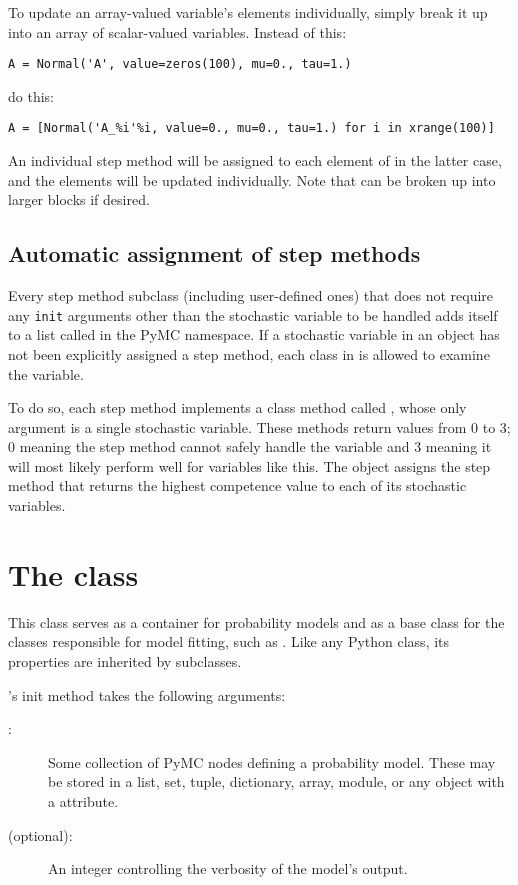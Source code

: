 To update an array-valued variable's elements individually, simply break it up into an array of scalar-valued variables. Instead of this:
\begin{verbatim}
A = Normal('A', value=zeros(100), mu=0., tau=1.)    
\end{verbatim}
do this:
\begin{verbatim}
A = [Normal('A_%i'%i, value=0., mu=0., tau=1.) for i in xrange(100)]
\end{verbatim}
An individual step method will be assigned to each element of  in the latter case, and the elements will be updated individually. Note that  can be broken up into larger blocks if desired.

\subsection{Automatic assignment of step methods} 
Every step method subclass (including user-defined ones) that does not require any \texttt{init} arguments other than the stochastic variable to be handled adds itself to a list called  in the PyMC namespace. If a stochastic variable in an  object has not been explicitly assigned a step method, each class in  is allowed to examine the variable. 

To do so, each step method implements a class method called , whose only argument is a single stochastic variable. These methods return values from 0 to 3; 0 meaning the step method cannot safely handle the variable and 3 meaning it will most likely perform well for variables like this. The  object assigns the step method that returns the highest competence value to each of its stochastic variables.

\hypertarget{model}{}
\section[The Model class]{The  class} \label{sec:Model}
This class serves as a container for probability models and as a base class for the classes responsible for model fitting, such as . Like any Python class, its properties are inherited by subclasses.

's init method takes the following arguments:
\begin{description}
    \item[:] Some collection of PyMC nodes defining a probability model. These may be stored in a list, set, tuple, dictionary, array, module, or any object with a  attribute.
    \item[ (optional):] An integer controlling the verbosity of the model's output.
\end{description}

